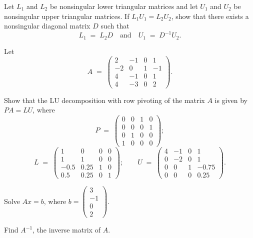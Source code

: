\begin{exercises}
\item Let $L_1$ and $L_2$ be nonsingular lower triangular matrices and let $U_1$ and $U_2$ be
nonsingular upper triangular matrices. If $L_1U_1 = L_2U_2$, show that there exists
a nonsingular diagonal matrix $D$ such that
\[
L_1 \;=\; L_2D \quad \text{and} \quad U_1 \;=\; D^{-1}U_2.
\]

\item Let
\[
A \;=\; \begin{pmatrix} 2 & -1 & 0 & 1\\ -2 & 0 & 1 & -1\\ 4 & -1 & 0 & 1\\ 4 & -3 & 0 & 2\end{pmatrix}.
\]
\begin{subparts}
\item Show that the LU decomposition with row pivoting of the matrix $A$ is given
by $PA = LU$, where
\[
P \;=\; \begin{pmatrix} 0&0&1&0\\ 0&0&0&1\\ 0&1&0&0\\ 1&0&0&0\end{pmatrix};
\]
\[
L \;=\; \begin{pmatrix} 1&0&0&0\\ 1&1&0&0\\ -0.5&0.25&1&0\\ 0.5&0.25&0&1\end{pmatrix};
\qquad
U \;=\; \begin{pmatrix} 4&-1&0&1\\ 0&-2&0&1\\ 0&0&1&-0.75\\ 0&0&0&0.25\end{pmatrix}.
\]
\item Solve $Ax = b$, where $b = \begin{pmatrix} 3\\ -1\\ 0\\ 2\end{pmatrix}$.
\item Find $A^{-1}$, the inverse matrix of $A$.
\end{subparts}


\end{exercises}
